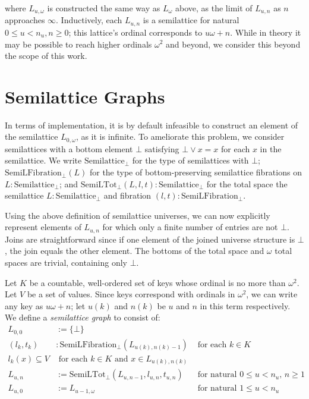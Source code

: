 \documentclass{article}
\begin{document}
      where $L_{u, \omega}$ is constructed the same way as $L_{\omega}$ above, as the limit of $L_{u, n}$ as $n$ approaches $\infty$. Inductively, each $L_{u, n}$ is a semilattice for natural $0 \leq u < n_u, n \geq 0$; this lattice's ordinal corresponds to $u \omega + n$. While in theory it may be possible to reach higher ordinals $\omega^2$ and beyond, we consider this beyond the scope of this work.

    \section{Semilattice Graphs}

      In terms of implementation, it is by default infeasible to construct an element of the semilattice $L_{0, \omega}$, as it is infinite. To ameliorate this problem, we consider semilattices with a bottom element $\bot$ satisfying $\bot \vee x = x$ for each $x$ in the semilattice. We write $\mathrm{Semilattice}_\bot$ for the type of semilattices with $\bot$; $\mathrm{SemiLFibration}_\bot(L)$ for the type of bottom-preserving semilattice fibrations on $L : \mathrm{Semilattice}_\bot$; and $\mathrm{SemiLTot}_\bot(L, l, t) : \mathrm{Semilattice}_\bot$ for the total space the semilattice $L : \mathrm{Semilattice}_\bot$ and fibration $(l, t) : \mathrm{SemiLFibration}_\bot$.

      Using the above definition of semilattice universes, we can now explicitly represent elements of $L_{u, n}$ for which only a finite number of entries are not $\bot$. Joins are straightforward since if one element of the joined universe structure is $\bot$, the join equals the other element. The bottoms of the total space and $\omega$ total spaces are trivial, containing only $\bot$.

      Let $K$ be a countable, well-ordered set of keys whose ordinal is no more than $\omega^2$. Let $V$ be a set of values. Since keys correspond with ordinals in $\omega^2$, we can write any key as $u\omega + n$; let $u(k)$ and $n(k)$ be $u$ and $n$ in this term respectively. We define a \emph{semilattice graph} to consist of:
      \begin{align*}
        L_{0, 0} &:= \{ \bot \} \\
        (l_k, t_k) &: \mathrm{SemiLFibration}_\bot(L_{u(k), n(k)-1}) & \text{ for each $k \in K$ } \\
        l_k(x) \subseteq V &\text{ for each $k \in K$ and $x \in L_{u(k), n(k)}$} \\
        L_{u, n} &:= \mathrm{SemiLTot}_\bot(L_{u, n-1}, l_{u, n}, t_{u, n})    & \text{ for natural $0 \leq u < n_u$, $n \geq 1$ } \\
        L_{u, 0} &:= L_{u-1, \omega} & \text{ for natural $1 \leq u < n_u$ }
      \end{align*}
\end{document}
